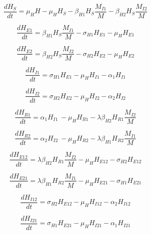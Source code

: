 \documentclass[journal]{IEEEtran}
\begin{document}
\begin{equation}
    \label{eq1}
    \frac{dH_S}{dt}=\mu_HH-\mu_HH_S-\beta_{H1}H_S\frac{M_{I1}}{M}-\beta_{H2}H_S\frac{M_{I2}}{M}
\end{equation}

\begin{equation}
    \label{eq1}
    \frac{dH_{E1}}{dt}=\beta_{H1}H_S\frac{M_{I1}}{M}-\sigma_{H1}H_{E1}-\mu_HH_{E1}
\end{equation}

\begin{equation}
    \label{eq1}
    \frac{dH_{E2}}{dt}=\beta_{H2}H_S\frac{M_{I2}}{M}-\sigma_{H2}H_{E2}-\mu_HH_{E2}
\end{equation}


\begin{equation}
    \label{eq1}
    \frac{dH_{I1}}{dt}=\sigma_{H1}H_{E1}-\mu_HH_{I1}-\alpha_1H_{I1}
\end{equation}

\begin{equation}
    \label{eq1}
    \frac{dH_{I2}}{dt}=\sigma_{H2}H_{E2}-\mu_HH_{I2}-\alpha_2H_{I2}
\end{equation}

\begin{equation}
    \label{eq1}
    \frac{dH_{R1}}{dt}={\alpha_1H_{I1}\ -\mu}_HH_{R1}-{\lambda\beta}_{H2}H_{R1}\frac{M_{I2}}{M}
\end{equation}


\begin{equation}
    \label{eq1}
    \frac{dH_{R2}}{dt}={\alpha_2H_{I2}\ -\mu}_HH_{R2}-{\lambda\beta}_{H1}H_{R2}\frac{M_{I1}}{M}
\end{equation}


\begin{equation}
    \label{eq1}
    \frac{dH_{E12}}{dt}={\lambda\beta}_{H2}H_{R1}\frac{M_{I2}}{M}-\mu_HH_{E12}-\sigma_{H2}H_{E12}
\end{equation}


\begin{equation}
    \label{eq1}
    \frac{dH_{E21}}{dt}={\lambda\beta}_{H1}H_{R2}\frac{M_{I1}}{M}-\mu_HH_{E21}-\sigma_{H1}H_{E21}
\end{equation}


\begin{equation}
    \label{eq1}
    \frac{dH_{I12}}{dt}=\sigma_{H2}H_{E12}-\mu_HH_{I12}-\alpha_2H_{I12}
\end{equation}


\begin{equation}
    \label{eq1}
    \frac{dH_{I21}}{dt}=\sigma_{H1}H_{E21}-\mu_HH_{I21}-\alpha_1H_{I21}
\end{equation}
\end{document}
